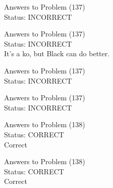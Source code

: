 \documentclass[11pt]{article}
\begin{document}
\begin{minipage}[t]{0.5\textwidth}
  {\centering
  
  Answers to Problem (137)\\
  Status: INCORRECT\\
  
  }
\end{minipage}
\begin{minipage}[t]{0.5\textwidth}
  {\centering
  
  Answers to Problem (137)\\
  Status: INCORRECT\\
  It's a ko, but Black can do better.\\
  }
\end{minipage}
\begin{minipage}[t]{0.5\textwidth}
  {\centering
  
  Answers to Problem (137)\\
  Status: INCORRECT\\
  
  }
\end{minipage}
\begin{minipage}[t]{0.5\textwidth}
  {\centering
  
  Answers to Problem (137)\\
  Status: INCORRECT\\
  
  }
\end{minipage}
\begin{minipage}[t]{0.5\textwidth}
  {\centering
  
  Answers to Problem (138)\\
  Status: CORRECT\\
  Correct\\
  }
\end{minipage}
\begin{minipage}[t]{0.5\textwidth}
  {\centering
  
  Answers to Problem (138)\\
  Status: CORRECT\\
  Correct\\
  }
\end{minipage}
\end{document}
